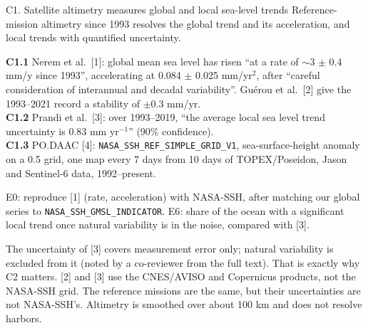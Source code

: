\documentclass[10pt]{article}
\begin{document}
\newpage
\begin{claimbox}{C1. Satellite altimetry measures global and local sea-level trends}
Reference-mission altimetry since 1993 resolves the global trend and its acceleration, and local trends with quantified uncertainty.
\end{claimbox}
\begin{libox}
\textbf{C1.1} Nerem et al.\ [1]: global mean sea level has risen ``at a rate of $\sim$3 $\pm$ 0.4 mm/y since 1993'', accelerating at
0.084 $\pm$ 0.025 mm/yr$^2$, after ``careful consideration of interannual and decadal variability''. Gu\'erou et al.\ [2] give the
1993--2021 record a stability of $\pm$0.3 mm/yr.\\
\textbf{C1.2} Prandi et al.\ [3]: over 1993--2019, ``the average local sea level trend uncertainty is 0.83 mm yr$^{-1}$'' (90\% confidence).\\
\textbf{C1.3} PO.DAAC [4]: \texttt{NASA\_SSH\_REF\_SIMPLE\_GRID\_V1}, sea-surface-height anomaly on a 0.5\textdegree{} grid, one map
every 7 days from 10 days of TOPEX/Poseidon, Jason and Sentinel-6 data, 1992--present.
\end{libox}
\begin{nubox}
E0: reproduce [1] (rate, acceleration) with NASA-SSH, after matching our global series to \texttt{NASA\_SSH\_GMSL\_INDICATOR}.
E6: share of the ocean with a significant local trend once natural variability is in the noise, compared with [3].
\end{nubox}
\begin{cabox}
The uncertainty of [3] covers measurement error only; natural variability is excluded from it (noted by a co-reviewer from the full
text). That is exactly why C2 matters. [2] and [3] use the CNES/AVISO and Copernicus products, not the NASA-SSH grid. The reference
missions are the same, but their uncertainties are not NASA-SSH's. Altimetry is smoothed over about 100 km and does not resolve harbors.
\end{cabox}
\end{document}
